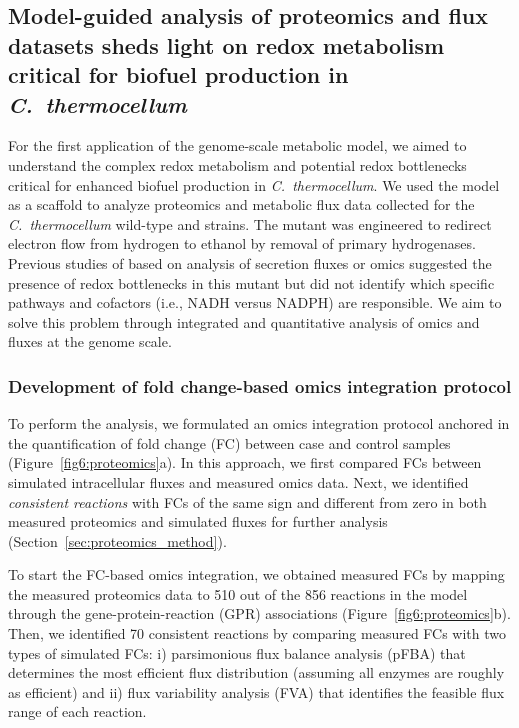 \subsection{Model-guided analysis of proteomics and flux datasets sheds light on redox metabolism critical for biofuel production in \textit{C.~thermocellum}}\label{sec:omics_analysis}

For the first application of the genome-scale metabolic model,
we aimed to understand the complex redox metabolism and potential redox bottlenecks critical for enhanced biofuel production in  \textit{C.~thermocellum}.
We used the model as a scaffold to analyze proteomics and metabolic flux data collected for the \textit{C.~thermocellum} wild-type and  strains.
The  mutant was engineered to redirect electron flow from hydrogen to ethanol by removal of primary hydrogenases.\citep{biswas2015, thompson2015} Previous studies of  based on analysis of secretion fluxes\citep{thompson2015} or omics\citep{biswas2017} suggested the presence of redox bottlenecks in this mutant but did not identify which specific pathways and cofactors (i.e., NADH versus NADPH) are responsible.  We aim to solve this problem through integrated and quantitative analysis of omics and fluxes at the genome scale.

\subsubsection{Development of fold change-based omics integration protocol}
To perform the analysis, we formulated an omics integration protocol anchored in the quantification of fold change (FC) between case and control samples (Figure~\ref{fig6:proteomics}a).
In this approach, we first compared FCs between simulated intracellular fluxes and measured omics data. Next, we identified \emph{consistent reactions} with FCs of the same sign and different from zero in both measured proteomics and simulated fluxes for further analysis (Section~\ref{sec:proteomics_method}).

To start the FC-based omics integration, we obtained measured FCs by mapping the measured proteomics data to 510 out of the 856 reactions in the model through the gene-protein-reaction (GPR) associations (Figure~\ref{fig6:proteomics}b).
Then, we identified 70 consistent reactions by comparing measured FCs with two types of simulated FCs: i) parsimonious flux balance analysis (pFBA) that determines the most efficient flux distribution (assuming all enzymes are roughly as efficient) and ii) flux variability analysis (FVA) that identifies the feasible flux range of each reaction.

